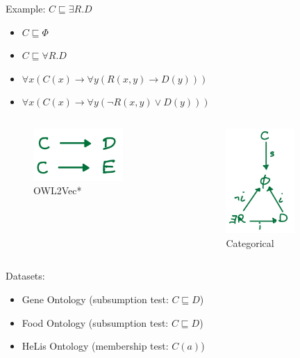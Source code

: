 \documentclass[bigger]{beamer}
\begin{document}
\begin{frame}[label={sec:orgcde4b2f}]{Example: \(C \sqsubseteq \exists R. D\)}
\begin{itemize}
\item \(C \sqsubseteq \Phi\)
\item \(C \sqsubseteq \forall R. D\)
\item \(\forall x (C(x) \to \forall y (R(x,y) \to D(y)))\)
\item \(\forall x (C(x) \to \forall y ( \lnot R(x,y) \lor D(y)))\)
\end{itemize}

\begin{columns}
\begin{column}{0.5\columnwidth}
\begin{figure}[htbp]
\centering
\includegraphics[height=2cm]{imgs/owl2vec1.jpg}
\caption{\label{fig:orgd798a4c}OWL2Vec*}
\end{figure}  
\end{column}

\begin{column}{0.5\columnwidth}
\begin{figure}[htbp]
\centering
\includegraphics[height=4cm]{imgs/cat2.jpg}
\caption{\label{fig:orgb83d846}Categorical}
\end{figure}
\end{column}
\end{columns}
\end{frame}



\begin{frame}[label={sec:org8abfe29}]{Datasets:}
\begin{itemize}
\item Gene Ontology (subsumption test: \(C \sqsubseteq D\))
\item Food Ontology (subsumption test: \(C \sqsubseteq D\))
\item HeLis Ontology (membership test: \(C(a)\))
\end{itemize}
\end{frame}
\end{document}
